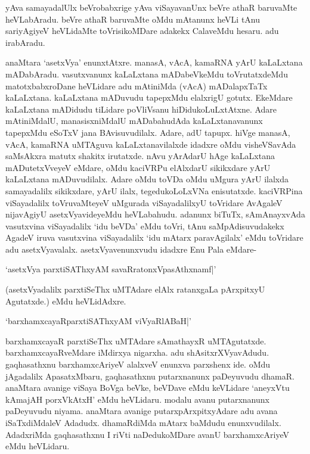 yAva samayadalUlx beVrobabxrige yAva viSayavanUnx beVre athaR baruvaMte heVLabAradu. beVre athaR baruvaMte oMdu mAtanunx heVLi tAnu sariyAgiyeV heVLidaMte toVrisikoMDare adakekx CalaveMdu hesaru. adu irabAradu.

anaMtara `asetxVya' enunxtAtxre. manasA, vAcA, kamaRNA yArU kaLaLxtana mADabAradu. vasutxvanunx kaLaLxtana mADabeVkeMdu toVrutatxdeMdu matotxbabxroDane heVLidare adu mAtiniMda (vAcA) mADalapxTaTx kaLaLxtana. kaLaLxtana mADuvudu tapepxMdu elalxrigU gotutx. EkeMdare kaLaLxtana mADidudu tiLidare poVliVsanu hiDidukoLuLxtAtxne. Adare mAtiniMdalU, manasisxniMdalU mADabahudAda kaLaLxtanavanunx tapepxMdu eSoTxV jana BAvisuvudilalx. Adare, adU tapupx. hiVge manasA, vAcA, kamaRNA uMTAguva kaLaLxtanavilalxde idadxre oMdu visheVSavAda saMsAkxra matutx shakitx irutatxde. nAvu yArAdarU hAge kaLaLxtana mADutetxVveyeV eMdare, oMdu kaciVRPu elAlxdarU sikikxdare yArU kaLaLxtana mADuvudilalx. Adare oMdu toVDa oMdu uMgura yArU ilalxda samayadalilx sikikxdare, yArU ilalx, tegedukoLoLxVNa enisutatxde. kaciVRPina viSayadalilx toVruvaMteyeV uMgurada viSayadalilxyU toVridare AvAgaleV nijavAgiyU asetxVyavideyeMdu heVLabahudu. adanunx biTuTx, sAmAnayxvAda vasutxvina viSayadalilx `idu beVDa' eMdu toVri, tAnu saMpAdisuvudakekx AgadeV iruva vasutxvina viSayadalilx `idu mAtarx paravAgilalx' eMdu toVridare adu asetxVyavalalx. asetxVyavenunxvudu idadxre Enu Pala eMdare-

\begin{shloka}
`asetxVya parxtiSAThxyAM savaRratonxVpasAthxnamf|'
\end{shloka}

(asetxVyadalilx parxtiSeThx uMTAdare elAlx ratanxgaLa pArxpitxyU Agutatxde.) eMdu heVLidAdxre.

\begin{shloka}
`barxhamxcayaRparxtiSAThxyAM viVyaRlABaH|'
\end{shloka}

barxhamxcayaR parxtiSeThx uMTAdare sAmathayxR uMTAgutatxde. barxhamxcayaRveMdare iMdirxya nigarxha. adu shAsitxrXVyavAdudu. gaqhasathxnu barxhamxcAriyeV alalxveV enunxva parxshenx ide. oMdu jAgadalilx ApasatxMbaru, gaqhasathxnu putarxnanunx paDeyuvudu dhamaR. anaMtara avanige viSaya BoVga beVke, beVDave eMdu keVLidare `aneyxVtu kAmajAH porxVkAtxH' eMdu heVLidaru. modalu avanu putarxnanunx paDeyuvudu niyama. anaMtara avanige putarxpArxpitxyAdare adu avana iSaTxdiMdaleV Adadudx. dhamaRdiMda mAtarx baMdudu enunxvudilalx. AdadxriMda gaqhasathxnu I riVti naDedukoMDare avanU barxhamxcAriyeV eMdu heVLidaru.

